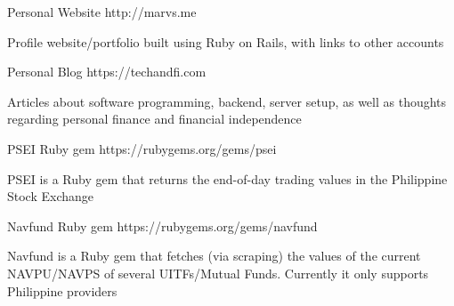 

\begin{cventries}

  \cventry
    {Personal Website}
    {http://marvs.me}
    {}
    {}
    {
      \begin{cvitems} %
        \item {Profile website/portfolio built using Ruby on Rails, with links to other accounts}
      \end{cvitems}
    }

  \cventry
    {Personal Blog}
    {https://techandfi.com}
    {}
    {}
    {
      \begin{cvitems} %
        \item {Articles about software programming, backend, server setup, as well as thoughts regarding personal finance and financial independence}
      \end{cvitems}
    }

  \cventry
    {PSEI Ruby gem}
    {https://rubygems.org/gems/psei}
    {}
    {}
    {
      \begin{cvitems} %
        \item {PSEI is a Ruby gem that returns the end-of-day trading values in the Philippine Stock Exchange}
      \end{cvitems}
    }

  \cventry
    {Navfund Ruby gem}
    {https://rubygems.org/gems/navfund}
    {}
    {}
    {
      \begin{cvitems} %
        \item {Navfund is a Ruby gem that fetches (via scraping) the values of the current NAVPU/NAVPS of several UITFs/Mutual Funds. Currently it only supports Philippine providers}
      \end{cvitems}
    }


\end{cventries}
